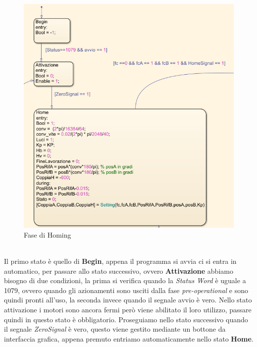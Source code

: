 \begin{figure}[ht]
\begin{center}
    \includegraphics[scale=0.8]{Immagini/Sperimentale/state1new.png}
    \caption{Fase di Homing}
    \label{fig:Zero}
\end{center}
\end{figure}
\\Il primo stato è quello di \textbf{Begin}, appena il programma si avvia ci si entra in automatico, per passare allo stato successivo, ovvero \textbf{Attivazione} abbiamo bisogno di due condizioni, la prima si verifica quando la \textit{Status Word} è uguale a 1079, ovvero quando gli azionamenti sono usciti dalla fase \textit{pre-operational} e sono quindi pronti all'uso, la seconda invece quando il segnale avvio è vero. Nello stato attivazione i motori sono ancora fermi però viene abilitato il loro utilizzo, passare quindi in questo stato è obbligatorio. Proseguiamo nello stato successivo quando il segnale \textit{ZeroSignal} è vero, questo viene gestito mediante un bottone da interfaccia grafica, appena premuto entriamo automaticamente nello stato \textbf{Home}. 
